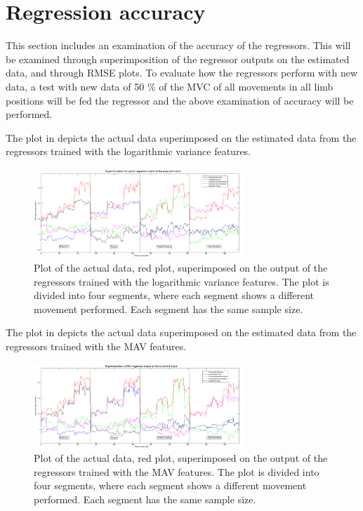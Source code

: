 \section{Regression accuracy}
This section includes an examination of the accuracy of the regressors. This will be examined through superimposition of the regressor outputs on the estimated data, and through RMSE plots. To evaluate how the regressors perform with new data, a test with new data of 50 $\%$ of the MVC of all movements in all limb positions will be fed the regressor and the above examination of accuracy will be performed. 

The plot in  depicts the actual data superimposed on the estimated data from the regressors trained with the logarithmic variance features. 

\begin{figure}[H]
	\includegraphics[width=0.7\textwidth]{figures/results/SuperPositionTestDataLogVar}  %
	\caption{Plot of the actual data, red plot, superimposed on the output of the regressors trained with the logarithmic variance features. The plot is divided into four segments, where each segment shows a different movement performed. Each segment has the same sample size.}
	\label{fig:SuperPositionTestDataLogVar}  %
\end{figure}

The plot in  depicts the actual data superimposed on the estimated data from the regressors trained with the MAV features. 

\begin{figure}[H]
	\includegraphics[width=0.7\textwidth]{figures/results/SuperPositionTestDataMAV}  %
	\caption{Plot of the actual data, red plot, superimposed on the output of the regressors trained with the MAV features. The plot is divided into four segments, where each segment shows a different movement performed. Each segment has the same sample size.}
	\label{fig:SuperPositionTestDataMAV}  %
\end{figure}


